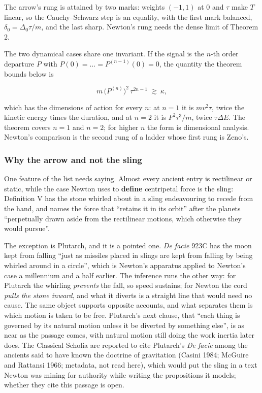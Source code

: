 \documentclass[11pt,a4paper]{article}
\begin{document}
The arrow's rung is attained by two marks: weights \((-1,1)\) at \(0\)
and \(\tau\) make \(T\) linear, so the Cauchy--Schwarz step is an
equality, with the first mark balanced, \(\delta_0=\Delta_0\tau/m\), and
the last sharp. Newton's rung needs the dense limit of Theorem 2.

The two dynamical cases share one invariant. If the signal is the
\(n\)-th order departure \(P\) with \(P(0)=\dots=P^{(n-1)}(0)=0\), the
quantity the theorem bounds below is

\[m\,\bigl(P^{(n)}\bigr)^2\,\tau^{2n-1}\ \gtrsim\ \kappa ,\]

which has the dimensions of action for every \(n\): at \(n=1\) it is
\(mv^2\tau\), twice the kinetic energy times the duration, and at
\(n=2\) it is \(F^2\tau^3/m\), twice \(\tau\Delta E\). The theorem
covers \(n=1\) and \(n=2\); for higher \(n\) the form is dimensional
analysis. Newton's comparison is the second rung of a ladder whose first
rung is Zeno's.

\hypertarget{why-the-arrow-and-not-the-sling}{%
\subsubsection{Why the arrow and not the
sling}\label{why-the-arrow-and-not-the-sling}}

One feature of the list needs saying. Almost every ancient entry is
rectilinear or static, while the case Newton uses to \textbf{define}
centripetal force is the sling: Definition V has the stone whirled about
in a sling endeavouring to recede from the hand, and names the force
that ``retains it in its orbit'' after the planets ``perpetually drawn
aside from the rectilinear motions, which otherwise they would pursue''.

The exception is Plutarch, and it is a pointed one. \emph{De facie} 923C
has the moon kept from falling ``just as missiles placed in slings are
kept from falling by being whirled around in a circle'', which is
Newton's apparatus applied to Newton's case a millennium and a half
earlier. The inference runs the other way: for Plutarch the whirling
\emph{prevents} the fall, so speed sustains; for Newton the cord
\emph{pulls the stone inward}, and what it diverts is a straight line
that would need no cause. The same object supports opposite accounts,
and what separates them is which motion is taken to be free. Plutarch's
next clause, that ``each thing is governed by its natural motion unless
it be diverted by something else'', is as near as the passage comes,
with natural motion still doing the work inertia later does. The
Classical Scholia are reported to cite Plutarch's \emph{De facie} among
the ancients said to have known the doctrine of gravitation (Casini
1984; McGuire and Rattansi 1966; metadata, not read here), which would
put the sling in a text Newton was mining for authority while writing
the propositions it models; whether they cite this passage is open.
\end{document}
